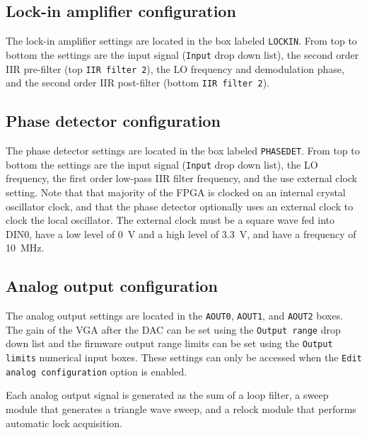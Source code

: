 \documentclass[aip,rsi,preprint,graphicx]{revtex4-1}
\begin{document}
\subsection{Lock-in amplifier configuration}

The lock-in amplifier settings are located in the box labeled {\tt LOCKIN}.  From top to bottom the settings are the input signal ({\tt Input} drop down list), the second order IIR pre-filter (top {\tt IIR filter 2}), the LO frequency and demodulation phase, and the second order IIR post-filter (bottom {\tt IIR filter 2}).

\subsection{Phase detector configuration}

The phase detector settings are located in the box labeled {\tt PHASEDET}.  From top to bottom the settings are the input signal ({\tt Input} drop down list), the LO frequency, the first order low-pass IIR filter frequency, and the use external clock setting.  Note that that majority of the FPGA is clocked on an internal crystal oscillator clock, and that the phase detector optionally uses an external clock to clock the local oscillator.  The external clock must be a square wave fed into DIN0, have a low level of 0~V and a high level of 3.3~V, and have a frequency of 10~MHz.

\subsection{Analog output configuration}

The analog output settings are located in the {\tt AOUT0}, {\tt AOUT1}, and {\tt AOUT2} boxes.  The gain of the VGA after the DAC can be set using the {\tt Output range} drop down list and the firmware output range limits can be set using the {\tt Output limits} numerical input boxes.  These settings can only be accessed when the {\tt Edit analog configuration} option is enabled.

Each analog output signal is generated as the sum of a loop filter, a sweep module that generates a triangle wave sweep, and a relock module that performs automatic lock acquisition.
\end{document}
